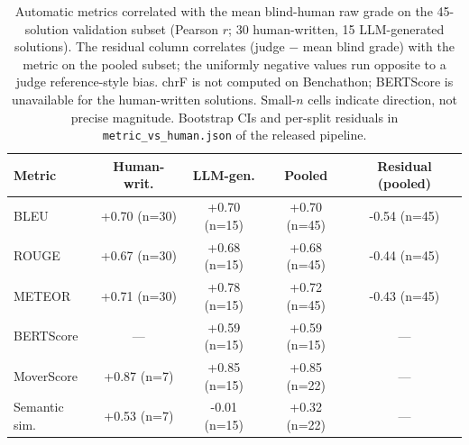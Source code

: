 \begin{table}[t]
\centering\footnotesize
\caption{Automatic metrics correlated with the mean blind-human raw grade on the 45-solution validation subset (Pearson $r$; 30 human-written, 15 LLM-generated solutions). The residual column correlates (judge $-$ mean blind grade) with the metric on the pooled subset; the uniformly negative values run opposite to a judge reference-style bias. chrF is not computed on Benchathon; BERTScore is unavailable for the human-written solutions. Small-$n$ cells indicate direction, not precise magnitude. Bootstrap CIs and per-split residuals in \texttt{metric\_vs\_human.json} of the released pipeline.}
\label{tbl-metric-vs-human}
\setlength{\tabcolsep}{4pt}
\begin{tabular*}{\textwidth}{@{\extracolsep{\fill}}lcccc@{}}
\toprule
Metric & Human-writ. & LLM-gen. & Pooled & Residual (pooled) \\
\midrule
BLEU & +0.70 {\scriptsize (n=30)} & +0.70 {\scriptsize (n=15)} & +0.70 {\scriptsize (n=45)} & -0.54 {\scriptsize (n=45)} \\
ROUGE & +0.67 {\scriptsize (n=30)} & +0.68 {\scriptsize (n=15)} & +0.68 {\scriptsize (n=45)} & -0.44 {\scriptsize (n=45)} \\
METEOR & +0.71 {\scriptsize (n=30)} & +0.78 {\scriptsize (n=15)} & +0.72 {\scriptsize (n=45)} & -0.43 {\scriptsize (n=45)} \\
BERTScore & — & +0.59 {\scriptsize (n=15)} & +0.59 {\scriptsize (n=15)} & — \\
MoverScore & +0.87 {\scriptsize (n=7)} & +0.85 {\scriptsize (n=15)} & +0.85 {\scriptsize (n=22)} & — \\
Semantic sim. & +0.53 {\scriptsize (n=7)} & -0.01 {\scriptsize (n=15)} & +0.32 {\scriptsize (n=22)} & — \\
\bottomrule
\end{tabular*}
\end{table}
